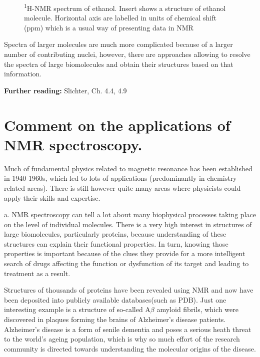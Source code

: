 \documentclass[a4paper, 12pt]{article}
\begin{document}
\begin{figure}[h]
\caption{\textsuperscript{1}H-NMR spectrum of ethanol. Insert shows a structure of ethanol molecule. Horizontal axis are labelled in units of chemical shift (ppm) which is a usual way of presenting data in NMR}
\label{fig:ethanol}
\centering
\end{figure}

  Spectra of larger molecules are much more complicated because of a larger number of contributing nuclei, however, there are approaches allowing to  resolve the spectra of large biomolecules and obtain their structures based on that information.
  
\textbf{Further reading:} Slichter, Ch. 4.4, 4.9 

\section{Comment on the applications of NMR spectroscopy.}

Much of fundamental physics related to magnetic resonance has been established in 1940-1960s, which led to lots of applications (predominantly in chemistry-related areas). There is still however quite many areas where physicists could apply their skills and expertise.
 
a. NMR spectroscopy can tell a lot about many biophysical processes taking place on the level of individual molecules. There is a very high interest in structures of large biomolecules, particularly proteins, because understanding of these structures can explain their functional properties. In turn, knowing those properties is important because of the clues they provide  for a more intelligent search of drugs affecting the function or dysfunction of its target and leading to treatment as a result.

Structures of thousands of proteins have been revealed using NMR and now have been deposited into publicly available databases(such as PDB). Just one interesting example is a structure of so-called A$\beta$ amyloid fibrils, which were discovered in plaques forming the brains of Alzheimer's disease patients. Alzheimer's disease is a form of senile dementia and poses a serious heath threat to the world's ageing population, which is why so much effort of the research community is directed towards understanding the molecular origins of the disease. 
\end{document}
